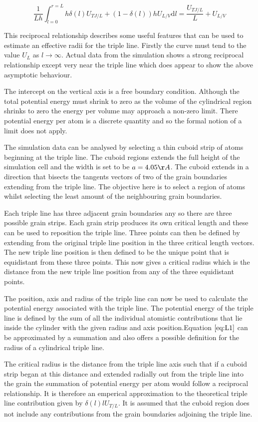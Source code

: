 \documentclass[12pt,a4paper]{book}
\begin{document}
\[ \frac{1}{L h}\int_{l=0}^{r=L} h \delta(l) U_{TJ/L} + (1-\delta(l) ) h U_{L/V}  \text{d}l = \frac{U_{TJ/L}}{L}  + U_{L/V} 
\label{eq:L1}
\]


This reciprocal relationship describes some useful features that can be used to estimate an effective radii for the triple line. Firstly the curve must tend to the value $U_L$ as $l \rightarrow \infty$. Actual data from the simulation shows a strong reciprocal relationship except very near the triple line which does appear to show the above asymptotic behaviour. 

The intercept on the vertical axis is a free boundary condition. Although the total potential energy must shrink to zero as the volume of the cylindrical region shrinks to zero the energy per volume may approach a non-zero limit. There potential energy per atom is a discrete quantity and so the formal notion of a limit does not apply. 


The simulation data can be analysed by selecting a thin cuboid strip of atoms beginning at the triple line. The cuboid regions extends the full height of the simulation cell and the width is set to be $a =4.05 \AA$. The cuboid extends in a direction that bisects the tangents vectors of two of the grain boundaries extending from the triple line. The objective here is to select a region of atoms whilst selecting the least amount of the neighbouring grain boundaries. 


Each triple line has three adjacent grain boundaries any so there are three possible grain strips. Each grain strip produces its own critical length and these can be used to reposition the triple line. Three points can then be defined by extending from the original triple line position in the three critical length vectors. The new triple line position is then defined to be the unique point that is equidistant from these three points. This now gives a critical radius which is the distance from the new triple line position from any of the three equidistant points.

The position, axis and radius of the triple line can now be used to calculate the potential energy associated with the triple line. The potential energy of the triple line is defined by the sum of all the individual atomistic contributions that lie inside the cylinder with the given radius and axis position.Equation $\ref{eq:L1}$ can be approximated by a summation and also offers a possible definition for the radius of a cylindrical triple line.

The critical radius is the distance from the triple line axis such that if a cuboid strip began at this distance and extended radially out from the triple line into the grain the summation of potential energy per atom would follow a reciprocal relationship.   It is therefore an emperical approximation to the theoretical triple line contribution given by $\delta(l) l U_{T/L}$. It is assumed that the cuboid region does not include any contributions from the grain boundaries adjoining the triple line.
\end{document}
